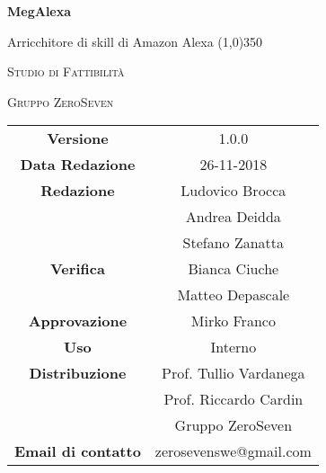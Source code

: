 \documentclass[a4paper,12pt]{book}
\author{Mirko Franco}
\date{26-11-2018}
\begin{document}
\begin{titlepage}
	\centering
	{\huge\bfseries MegAlexa\par}
	Arricchitore di skill di Amazon Alexa
	\line(1,0){350} \\
	{\scshape\LARGE Studio di Fattibilità \par}
	\vspace{1cm}
	{\scshape Gruppo ZeroSeven \par}
	\logo
	\begin{tabular}{c|c}
		{\hfill \textbf{Versione}} 			& 1.0.0			\\
		{\hfill\textbf{Data Redazione}} 	& 26-11-2018		\\ 
		{\hfill\textbf{Redazione}} 			&  		Ludovico Brocca \\ & Andrea Deidda\\ & Stefano Zanatta		\\
		{\hfill\textbf{Verifica}} 				&  					Bianca Ciuche \\ & Matteo Depascale\\ 
		{\hfill\textbf{Approvazione}} 		&  				Mirko Franco\\ 
		{\hfill\textbf{Uso}} 					& 		Interno		\\ 
		{\hfill\textbf{Distribuzione}} 			& 			Prof. Tullio Vardanega \\ & Prof. Riccardo Cardin \\ & Gruppo ZeroSeven		\\ 
		{\hfill\textbf{Email di contatto}} & zerosevenswe@gmail.com \\
	\end{tabular}
\end{titlepage}
	

	
\label{LastFrontPage}
	\newpage	
	
	\pagestyle{mymain}
	\tableofcontents
		
	
	
	
	
	
		
	
	\label{LastPage}
\end{document}

